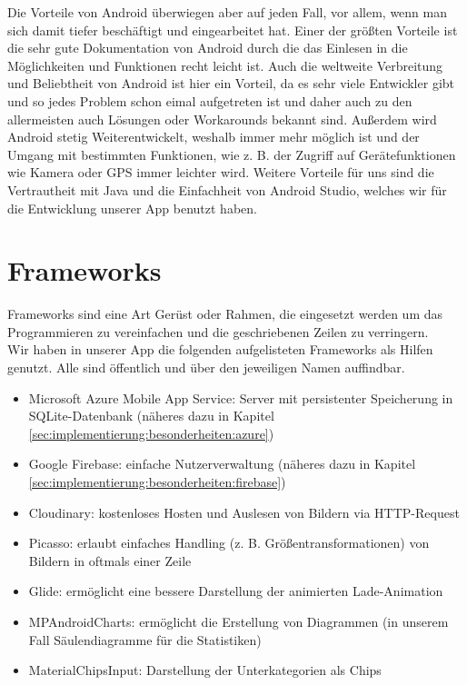 Die Vorteile von Android überwiegen aber auf jeden Fall, vor allem, wenn man sich damit tiefer beschäftigt und eingearbeitet hat. Einer der größten Vorteile ist die sehr gute Dokumentation von Android durch die das Einlesen in die Möglichkeiten und Funktionen recht leicht ist. Auch die weltweite Verbreitung und Beliebtheit von Android ist hier ein Vorteil, da es sehr viele Entwickler gibt und so jedes Problem schon eimal aufgetreten ist und daher auch zu den allermeisten auch Lösungen oder Workarounds bekannt sind.
Außerdem wird Android stetig Weiterentwickelt, weshalb immer mehr möglich ist und der Umgang mit bestimmten Funktionen, wie z. B. der Zugriff auf Gerätefunktionen wie Kamera oder GPS immer leichter wird.
Weitere Vorteile für uns sind die Vertrautheit mit Java und die Einfachheit von Android Studio, welches wir für die Entwicklung unserer App benutzt haben.

\section{Frameworks}
\label{sec:grundlagen:frameworks}
Frameworks sind eine Art Gerüst oder Rahmen, die eingesetzt werden um das Programmieren zu vereinfachen und die geschriebenen Zeilen zu verringern.\\
Wir haben in unserer App die folgenden aufgelisteten Frameworks als Hilfen genutzt. Alle sind öffentlich und über den jeweiligen Namen auffindbar.
\begin{itemize}
\item Microsoft Azure Mobile App Service: Server mit persistenter Speicherung in SQLite-Datenbank (näheres dazu in Kapitel \ref{sec:implementierung:besonderheiten:azure})
\item Google Firebase: einfache Nutzerverwaltung (näheres dazu in Kapitel \ref{sec:implementierung:besonderheiten:firebase})
\item Cloudinary: kostenloses Hosten und Auslesen von Bildern via HTTP-Request
\item Picasso: erlaubt einfaches Handling (z. B. Größentransformationen) von Bildern in oftmals einer Zeile
\item Glide: ermöglicht eine bessere Darstellung der animierten Lade-Animation
\item MPAndroidCharts: ermöglicht die Erstellung von Diagrammen (in unserem Fall Säulendiagramme für die Statistiken)
\item MaterialChipsInput: Darstellung der Unterkategorien als Chips
\end{itemize}



















